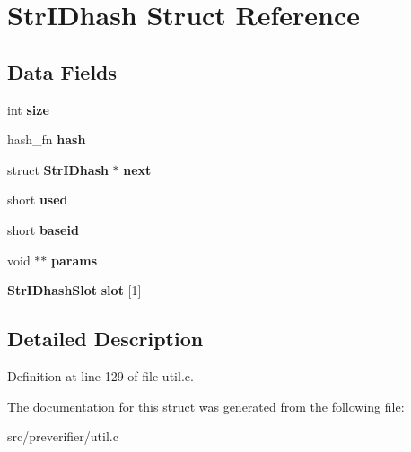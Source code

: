 \section{StrIDhash Struct Reference}
\label{struct_str_i_dhash}
\subsection*{Data Fields}
\begin{DoxyCompactItemize}
\item 
int {\bfseries size}\label{struct_str_i_dhash_a004afd441e8782f1edd4a29d70011fd0}

\item 
hash\_\-fn {\bfseries hash}\label{struct_str_i_dhash_ad398f7eda37442c1d175ee440101dd3f}

\item 
struct {\bf StrIDhash} $\ast$ {\bfseries next}\label{struct_str_i_dhash_a44d4fc658e823e7a968492b9ab5a5f77}

\item 
short {\bfseries used}\label{struct_str_i_dhash_a6502878418b3777c51a80e1d06915d17}

\item 
short {\bfseries baseid}\label{struct_str_i_dhash_a85fab494f9a3a101ba2bd2fc28ec223c}

\item 
void $\ast$$\ast$ {\bfseries params}\label{struct_str_i_dhash_a81854610e6b0b28b6ac54170438c111d}

\item 
{\bf StrIDhashSlot} {\bfseries slot} [1]\label{struct_str_i_dhash_af087d3b4e5cde223b99709da405fab98}

\end{DoxyCompactItemize}


\subsection{Detailed Description}


Definition at line 129 of file util.c.



The documentation for this struct was generated from the following file:\begin{DoxyCompactItemize}
\item 
src/preverifier/util.c\end{DoxyCompactItemize}

